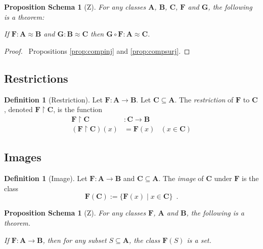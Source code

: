 \documentclass{book}
\let\qed\relax
\newtheorem{props}[ax]{Proposition Schema}
\theoremstyle{definition}
\newtheorem{df}[ax]{Definition}
\begin{document}
\begin{props}[Z]
\label{prop:compbij}
For any classes $\mathbf{A}$, $\mathbf{B}$, $\mathbf{C}$, $\mathbf{F}$ and $\mathbf{G}$, the following is a theorem:

If $\mathbf{F} : \mathbf{A} \approx \mathbf{B}$ and $\mathbf{G} : \mathbf{B} \approx \mathbf{C}$ then $\mathbf{G} \circ \mathbf{F} : \mathbf{A} \approx \mathbf{C}$.
\end{props}

\begin{proof}
\pf\ Propositions \ref{prop:compinj} and \ref{prop:compsurj}. \qed
\end{proof}

\subsection{Restrictions}

\begin{df}[Restriction]
Let $\mathbf{F} : \mathbf{A} \rightarrow \mathbf{B}$. Let $\mathbf{C} \subseteq \mathbf{A}$. The \emph{restriction} of $\mathbf{F}$ to $\mathbf{C}$, denoted $\mathbf{F} \restriction \mathbf{C}$, is the function
\begin{align*}
\mathbf{F} \restriction \mathbf{C} & : \mathbf{C} \rightarrow \mathbf{B} \\
(\mathbf{F} \restriction \mathbf{C})(x) & = \mathbf{F}(x) & (x \in \mathbf{C})
\end{align*}
\end{df}

\subsection{Images}

\begin{df}[Image]
Let $\mathbf{F} : \mathbf{A} \rightarrow \mathbf{B}$ and $\mathbf{C} \subseteq \mathbf{A}$. The \emph{image} of $\mathbf{C}$ under $\mathbf{F}$ is the class
\[ \mathbf{F}(\mathbf{C}) := \{ \mathbf{F}(x) \mid x \in \mathbf{C} \} \enspace . \]
\end{df}

\begin{props}[Z]
For any classes $\mathbf{F}$, $\mathbf{A}$ and $\mathbf{B}$, the following is a theorem.

If $\mathbf{F} : \mathbf{A} \rightarrow \mathbf{B}$, then for any subset $S \subseteq \mathbf{A}$, the class $\mathbf{F}(S)$ is a set.
\end{props}
\end{document}
